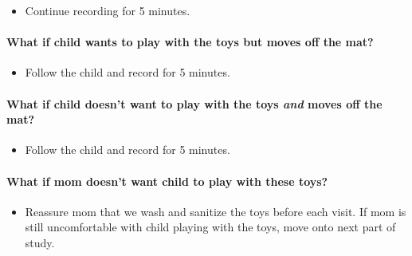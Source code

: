 \documentclass[
  12pt,
]{book}
\providecommand{\tightlist}{%
  \setlength{\itemsep}{0pt}\setlength{\parskip}{0pt}}
\begin{document}
\begin{itemize}
\tightlist
\item
  Continue recording for 5 minutes.
\end{itemize}

\hypertarget{what-if-child-wants-to-play-with-the-toys-but-moves-off-the-mat}{%
\paragraph*{What if child wants to play with the toys but moves off the mat?}\label{what-if-child-wants-to-play-with-the-toys-but-moves-off-the-mat}}

\begin{itemize}
\tightlist
\item
  Follow the child and record for 5 minutes.
\end{itemize}

\hypertarget{what-if-child-doesnt-want-to-play-with-the-toys-and-moves-off-the-mat}{%
\paragraph*{\texorpdfstring{What if child doesn't want to play with the toys \emph{and} moves off the mat?}{What if child doesn't want to play with the toys and moves off the mat?}}\label{what-if-child-doesnt-want-to-play-with-the-toys-and-moves-off-the-mat}}

\begin{itemize}
\tightlist
\item
  Follow the child and record for 5 minutes.
\end{itemize}

\hypertarget{what-if-mom-doesnt-want-child-to-play-with-these-toys}{%
\paragraph*{What if mom doesn't want child to play with these toys?}\label{what-if-mom-doesnt-want-child-to-play-with-these-toys}}

\begin{itemize}
\tightlist
\item
  Reassure mom that we wash and sanitize the toys before each visit. If mom is still uncomfortable with child playing with the toys, move onto next part of study.
\end{itemize}
\end{document}

